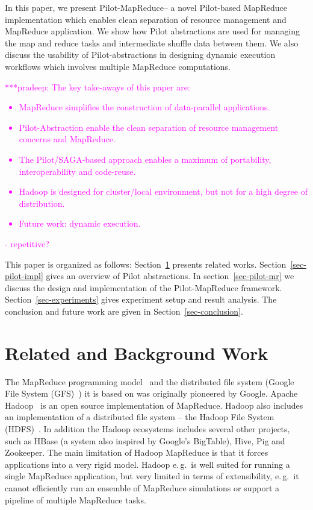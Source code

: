 \documentclass{acm_proc_article-sp}
\newcommand{\pnote}[1]{ {\textcolor{magenta} { ***pradeep: #1 }}}
\newcommand{\pnote}[1]{}
\newcommand{\pilot}{Pilot\xspace}
\newcommand{\pilotmapreduce}{Pilot-MapReduce\xspace}
\begin{document}
In this paper, we present \pilotmapreduce -- a novel \pilot-based MapReduce
implementation which enables clean separation of resource management and
MapReduce application. We show how \pilot abstractions are used for managing the
map and reduce tasks and intermediate shuffle data between them. We also discuss
the usability of \pilot-abstractions in designing dynamic execution workflows
which involves multiple MapReduce computations.

\pnote{The key take-aways of this paper are:
\begin{itemize}
	\item MapReduce simplifies the construction of data-parallel applications.
	\item Pilot-Abstraction enable the clean separation of resource management concerns and MapReduce.
	\item The Pilot/SAGA-based approach enables a maximum of portability, interoperability and code-reuse.
	\item Hadoop is designed for cluster/local environment, but not for a high degree of distribution.
	\item Future work: dynamic execution.
\end{itemize}  - repetitive? }

This paper is organized as follows: Section~\ref{sec:related_work} presents
related works. Section~\ref{sec-pilot-impl} gives an overview of \pilot
abstractions. In section~\ref{sec-pilot-mr} we discuss the design and
implementation of the \pilotmapreduce framework. Section~\ref{sec-experiments}
gives experiment setup and result analysis. The conclusion and future work are
given in Section~\ref{sec-conclusion}.

\section{Related and Background Work}
\label{sec:related_work}
The MapReduce programming model~\cite{Dean:2004:MSD:1251254.1251264}
and the distributed file system (Google File System
(GFS)~\cite{Ghemawat:2003:GFS:1165389.945450}) it is based on was
originally pioneered by Google. Apache Hadoop~\cite{hadoop} is an open
source implementation of MapReduce. Hadoop also includes an
implementation of a distributed file system -- the Hadoop File System
(HDFS)~\cite{Borthakur:2007fk}. In addition the Hadoop ecosystems
includes several other projects, such as HBase (a system also inspired
by Google's BigTable), Hive, Pig and Zookeeper. The main limitation of
Hadoop MapReduce is that it forces applications into a very rigid
model. Hadoop e.\,g.\ is well suited for running a single MapReduce
application, but very limited in terms of extensibility, e.\,g.\ it
cannot efficiently run an ensemble of MapReduce simulations or support
a pipeline of multiple MapReduce tasks.
\end{document}
